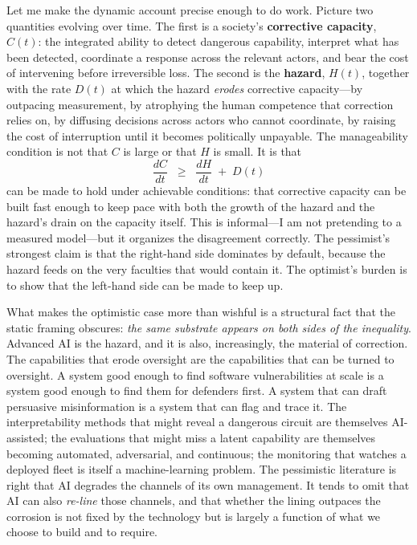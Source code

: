 \documentclass[11pt]{article}
\begin{document}
Let me make the dynamic account precise enough to do work. Picture two quantities evolving over time. The first is a society's \textbf{corrective capacity}, $C(t)$: the integrated ability to detect dangerous capability, interpret what has been detected, coordinate a response across the relevant actors, and bear the cost of intervening before irreversible loss. The second is the \textbf{hazard}, $H(t)$, together with the rate $D(t)$ at which the hazard \emph{erodes} corrective capacity---by outpacing measurement, by atrophying the human competence that correction relies on, by diffusing decisions across actors who cannot coordinate, by raising the cost of interruption until it becomes politically unpayable. The manageability condition is not that $C$ is large or that $H$ is small. It is that
\[
\frac{dC}{dt} \;\;\geq\;\; \frac{dH}{dt} \;+\; D(t)
\]
can be made to hold under achievable conditions: that corrective capacity can be built fast enough to keep pace with both the growth of the hazard and the hazard's drain on the capacity itself. This is informal---I am not pretending to a measured model---but it organizes the disagreement correctly. The pessimist's strongest claim is that the right-hand side dominates by default, because the hazard feeds on the very faculties that would contain it. The optimist's burden is to show that the left-hand side can be made to keep up.

What makes the optimistic case more than wishful is a structural fact that the static framing obscures: \emph{the same substrate appears on both sides of the inequality}. Advanced AI is the hazard, and it is also, increasingly, the material of correction. The capabilities that erode oversight are the capabilities that can be turned to oversight. A system good enough to find software vulnerabilities at scale is a system good enough to find them for defenders first. A system that can draft persuasive misinformation is a system that can flag and trace it. The interpretability methods that might reveal a dangerous circuit are themselves AI-assisted; the evaluations that might miss a latent capability are themselves becoming automated, adversarial, and continuous; the monitoring that watches a deployed fleet is itself a machine-learning problem. The pessimistic literature is right that AI degrades the channels of its own management. It tends to omit that AI can also \emph{re-line} those channels, and that whether the lining outpaces the corrosion is not fixed by the technology but is largely a function of what we choose to build and to require.
\end{document}
